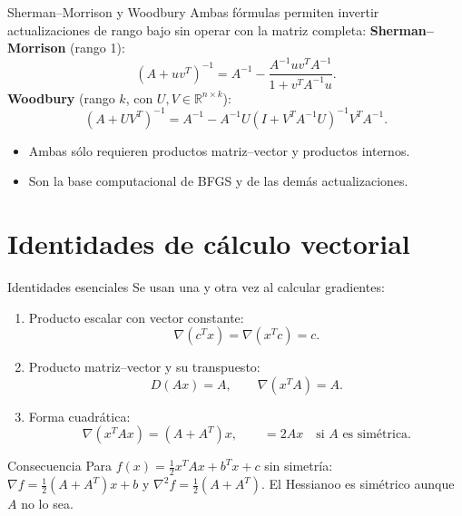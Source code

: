 \documentclass[10pt,aspectratio=169]{beamer}
\begin{document}
\begin{frame}{Sherman--Morrison y Woodbury}
  \small
  Ambas fórmulas permiten invertir actualizaciones de rango bajo sin operar
  con la matriz completa:
  \textbf{Sherman--Morrison} (rango 1):
  \[
    (A+uv^{T})^{-1}=A^{-1}-
      \frac{A^{-1}uv^{T}A^{-1}}{1+v^{T}A^{-1}u}.
  \]
  \textbf{Woodbury} (rango $k$, con $U,V\in\mathbb{R}^{n\times k}$):
  \[
    (A+UV^{T})^{-1}=A^{-1}-
      A^{-1}U\left(I+V^{T}A^{-1}U\right)^{-1}V^{T}A^{-1}.
  \]
  \begin{itemize}
    \item Ambas sólo requieren productos matriz--vector y productos internos.
    \item Son la base computacional de BFGS y de las demás actualizaciones.
  \end{itemize}
\end{frame}

\section{Identidades de cálculo vectorial}

\begin{frame}{Identidades esenciales}
  \small
  Se usan una y otra vez al calcular gradientes:
  \begin{enumerate}
    \item Producto escalar con vector constante:
      \[
        \nabla(c^{T}x)=\nabla(x^{T}c)=c.
      \]
    \item Producto matriz--vector y su transpuesto:
      \[
        D(Ax)=A, \qquad \nabla(x^{T}A)=A.
      \]
    \item Forma cuadrática:
      \[
        \nabla(x^{T}Ax)=(A+A^{T})x,
        \qquad =2Ax \quad\text{si } A \text{ es simétrica}.
      \]
  \end{enumerate}
  \begin{alertblock}{Consecuencia}
    Para $f(x)=\tfrac12x^{T}Ax+b^{T}x+c$ sin simetría:
    $\nabla f=\tfrac12(A+A^{T})x+b$ y
    $\nabla^{2}f=\tfrac12(A+A^{T})$.
    El Hessianoo es simétrico aunque $A$ no lo sea.
  \end{alertblock}
\end{frame}
\end{document}
